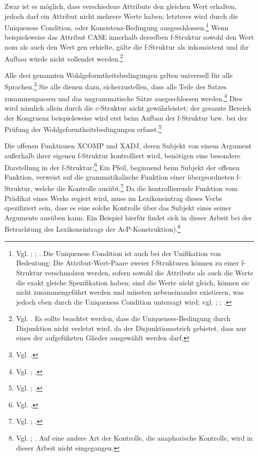 \documentclass[12pt,a4paper]{article}
\begin{document}
Zwar ist es möglich, dass verschiedene Attribute den gleichen Wert erhalten, jedoch darf ein Attribut nicht mehrere Werte haben; letzteres wird durch die Uniqueness Condition, oder Konsistenz-Bedingung ausgeschlossen.\footnote{Vgl. \cite[62]{Falk}; \cite[29]{Rohrer}; \cite[18-9]{Skript}. Die Uniqueness Condition ist auch bei der Unifikation von Bedeutung: Die Attribut-Wert-Paare zweier f-Strukturen können zu einer f-Struktur verschmolzen werden, sofern sowohl die Attribute als auch die Werte die exakt gleiche Spezifikation haben; sind die Werte nicht gleich, können sie nicht zusammengeführt werden und müssten nebeneinander existieren, was jedoch eben durch die Uniqueness Condition untersagt wird; vgl. \cite[68]{Falk}; \cite[37]{Rohrer}; \cite[18-9]{Skript}.} Wenn beispielsweise das Attribut CASE innerhalb derselben f-Struktur sowohl den Wert nom als auch den Wert gen erhielte, gälte die f-Struktur als inkonsistent und ihr Aufbau würde nicht vollendet werden.\footnote{Vgl. \cite[29; 35]{Rohrer}. Es sollte beachtet werden, dass die Uniqueness-Bedingung durch Disjunktion nicht verletzt wird, da der Disjunktionsstrich gebietet, dass nur eines der aufgeführten Glieder ausgewählt werden darf.} 

Alle drei genannten Wohlgeformtheitsbedingungen gelten universell für alle Sprachen.\footnote{Vgl. \cite[21]{Skript}.} Sie alle dienen dazu, sicherzustellen, dass alle Teile des Satzes zusammenpassen und das ungrammatische Sätze ausgeschlossen werden.\footnote{Vgl. \cite[58; 62]{Falk}; \cite[29]{Rohrer}.} Dies wird nämlich allein durch die c-Struktur nicht gewährleistet; der gesamte Bereich der Kongruenz beispielsweise wird erst beim Aufbau der f-Struktur bzw. bei der Prüfung der Wohlgeformtheitsbedingungen erfasst.\footnote{Vgl. \cite[24]{Rohrer}; \cite[18]{Skript}.}

Die offenen Funktionen XCOMP und XADJ, deren Subjekt von einem Argument außerhalb ihrer eigenen f-Struktur kontrolliert wird, benötigen eine besondere Darstellung in der f-Struktur:\footnote{Vgl. \cite[10; 14]{Dal}.} Ein Pfeil, beginnend beim Subjekt der offenen Funktion, verweist auf die grammatikalische Funktion einer übergeordneten f-Struktur, welche die Kontrolle ausübt.\footnote{Vgl. \cite[54-5]{Skript}; \cite[40]{Rohrer}.} Da die kontrollierende Funktion vom Prädikat eines Werks regiert wird, muss im Lexikoneintrag dieses Verbs spezifiziert sein, dass es eine solche Kontrolle über das Subjekt eines seiner Argumente ausüben kann. Ein Beispiel hierfür findet sich in dieser Arbeit bei der Betrachtung des Lexikoneintrags der AcP-Konstruktion).\footnote{Vgl. \cite[54-5]{Skript}; \cite[30; 40]{Rohrer}. Auf eine andere Art der Kontrolle, die anaphorische Kontrolle, wird in dieser Arbeit nicht eingegangen.}
\end{document}
